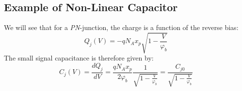 \subsection{Example of Non-Linear Capacitor}
We will see that for a \emph{PN}-junction, the charge is a function of the reverse bias:
    \begin{equation} 
        {Q_j}(V) =  - q{N_A}{x_p}\sqrt {1 - \frac{V}{{{\varphi _b}}}} 
    \end{equation}
The small signal capacitance is therefore given by:
    \begin{equation} 
        {C_j}(V) = \frac{{dQ_j^{}}}{{dV}} = \frac{{q{N_A}{x_p}}}{{2{\varphi _b}}}\frac{1}{{\sqrt {1 - \frac{V}{{{\varphi _b}}}}}} = \frac{{C_{j0}^{}}}{{\sqrt {1 - \frac{V}{{{\varphi _b}}}}}} 
    \end{equation}
